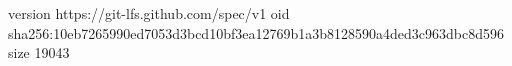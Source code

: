 version https://git-lfs.github.com/spec/v1
oid sha256:10eb7265990ed7053d3bcd10bf3ea12769b1a3b8128590a4ded3c963dbc8d596
size 19043
